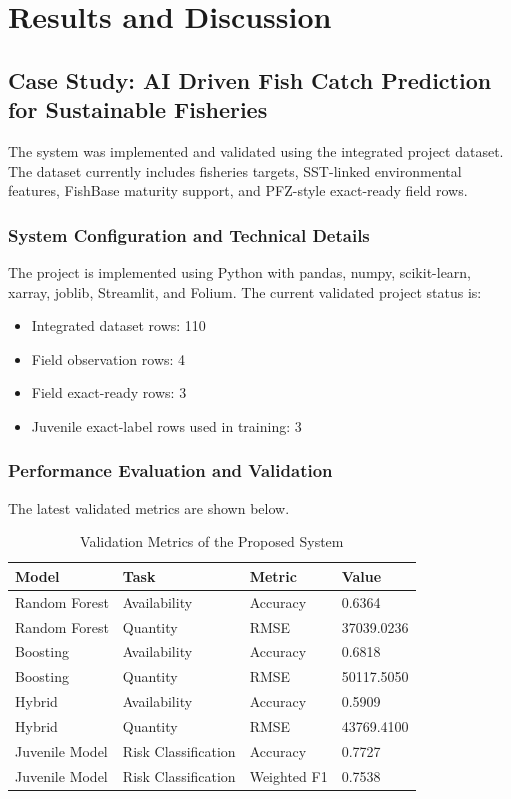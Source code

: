 \documentclass[12pt,a4paper]{report}
\begin{document}
\chapter{Results and Discussion}

\section{Case Study: AI Driven Fish Catch Prediction for Sustainable Fisheries}
The system was implemented and validated using the integrated project dataset. The dataset currently includes fisheries targets, SST-linked environmental features, FishBase maturity support, and PFZ-style exact-ready field rows.

\subsection{System Configuration and Technical Details}
The project is implemented using Python with pandas, numpy, scikit-learn, xarray, joblib, Streamlit, and Folium. The current validated project status is:
\begin{itemize}[leftmargin=1.5cm]
    \item Integrated dataset rows: 110
    \item Field observation rows: 4
    \item Field exact-ready rows: 3
    \item Juvenile exact-label rows used in training: 3
\end{itemize}

\subsection{Performance Evaluation and Validation}
The latest validated metrics are shown below.
\begin{table}[H]
\centering
\caption{Validation Metrics of the Proposed System}
\begin{tabular}{p{} p{} p{} p{}}
\toprule
\textbf{Model} & \textbf{Task} & \textbf{Metric} & \textbf{Value} \\
\midrule
Random Forest & Availability & Accuracy & 0.6364 \\
Random Forest & Quantity & RMSE & 37039.0236 \\
Boosting & Availability & Accuracy & 0.6818 \\
Boosting & Quantity & RMSE & 50117.5050 \\
Hybrid & Availability & Accuracy & 0.5909 \\
Hybrid & Quantity & RMSE & 43769.4100 \\
Juvenile Model & Risk Classification & Accuracy & 0.7727 \\
Juvenile Model & Risk Classification & Weighted F1 & 0.7538 \\
\bottomrule
\end{tabular}
\end{table}
\end{document}
